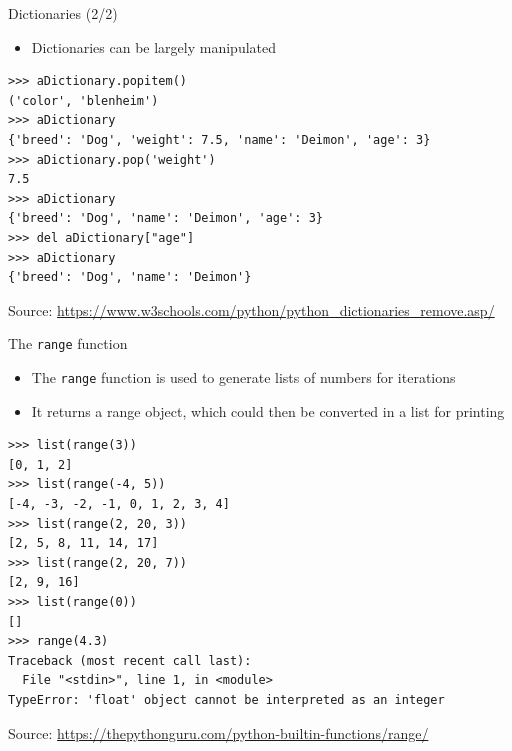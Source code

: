 \documentclass{beamer}
\begin{document}
\begin{frame}[fragile]
{\centerline{Dictionaries (2/2)}}
\begin{itemize}
    \item Dictionaries can be largely manipulated
\end{itemize}
\begin{lstlisting}[style=myPythonStyle]
>>> aDictionary.popitem()
('color', 'blenheim')
>>> aDictionary
{'breed': 'Dog', 'weight': 7.5, 'name': 'Deimon', 'age': 3}
>>> aDictionary.pop('weight')
7.5
>>> aDictionary
{'breed': 'Dog', 'name': 'Deimon', 'age': 3}
>>> del aDictionary["age"]
>>> aDictionary
{'breed': 'Dog', 'name': 'Deimon'}
\end{lstlisting}


\begin{center}
\tiny Source: \url{https://www.w3schools.com/python/python_dictionaries_remove.asp/}
\end{center}

\end{frame}

\begin{frame}[fragile]
{\centerline{The \texttt{range} function}}
\begin{itemize}
    \item The \texttt{range} function is used to generate lists of numbers for iterations
    \item It returns a range object, which could then be converted in a list for printing
\end{itemize}
\begin{lstlisting}[style=myPythonStyle]
>>> list(range(3))
[0, 1, 2]
>>> list(range(-4, 5))
[-4, -3, -2, -1, 0, 1, 2, 3, 4]
>>> list(range(2, 20, 3))
[2, 5, 8, 11, 14, 17]
>>> list(range(2, 20, 7))
[2, 9, 16]
>>> list(range(0))
[]
>>> range(4.3)
Traceback (most recent call last):
  File "<stdin>", line 1, in <module>
TypeError: 'float' object cannot be interpreted as an integer
\end{lstlisting}

\begin{center}
\tiny Source: \url{https://thepythonguru.com/python-builtin-functions/range/}
\end{center}

\end{frame}
\end{document}

